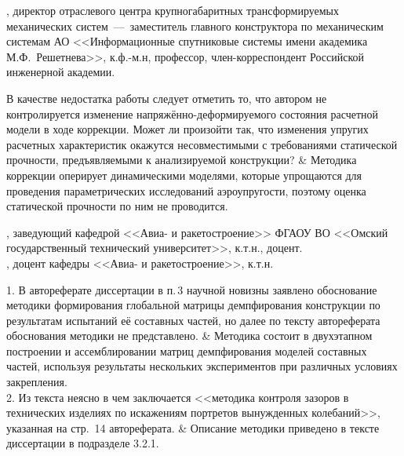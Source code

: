 \begin{frame}
	\beginSkip
	, директор отраслевого центра крупногабаритных трансформируемых механических систем~---~заместитель главного конструктора по механическим системам АО <<Информационные спутниковые системы имени академика М.Ф.~Решетнева>>, к.ф.-м.н, профессор, член-корреспондент Российской инженерной академии.
	\begin{comtblr}{18em}
		В качестве недостатка работы следует отметить то, что автором не контролируется изменение напряжённо-деформируемого состояния расчетной модели в ходе коррекции. Может ли произойти так, что изменения упругих расчетных характеристик окажутся несовместимыми с требованиями статической прочности, предъявляемыми к анализируемой конструкции?
		&
		Методика коррекции оперирует динамическими моделями, которые упрощаются для проведения параметрических исследований аэроупругости, поэтому оценка статической прочности по ним не проводится. 
	\end{comtblr}
\end{frame}

\begin{frame}
	\beginSkip
	, заведующий кафедрой <<Авиа- и ракетостроение>> ФГАОУ ВО <<Омский государственный технический университет>>, к.т.н., доцент. \\
	, доцент кафедры <<Авиа- и ракетостроение>>, к.т.н. \\
	\begin{comtblr}{}
		1. В автореферате диссертации в п.\,3 научной новизны заявлено обоснование методики формирования глобальной матрицы демпфирования конструкции по результатам испытаний её составных частей, но далее по тексту автореферата обоснования методики не представлено.
		&
		Методика состоит в двухэтапном построении и ассемблировании матриц демпфирования моделей составных частей, используя результаты нескольких экспериментов при различных условиях закрепления. \\
		2. Из текста неясно в чем заключается <<методика контроля зазоров в технических изделиях по искажениям портретов вынужденных колебаний>>, указанная на стр.~14 автореферата.
		&
		Описание методики приведено в тексте диссертации в подразделе 3.2.1. 
	\end{comtblr}
\end{frame}

